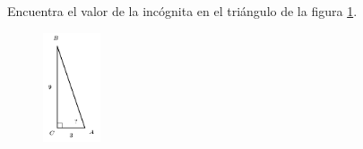 \question[15]  Encuentra el valor de la incógnita en el triángulo de la figura \ref{fig:angle_functrig_29}.
\begin{figure}[H]
    \begin{center}
        \includegraphics[width=0.15\textwidth]{../images/angle_functrig_29.png}
    \end{center}
    \caption{}
    \label{fig:angle_functrig_29}
\end{figure}